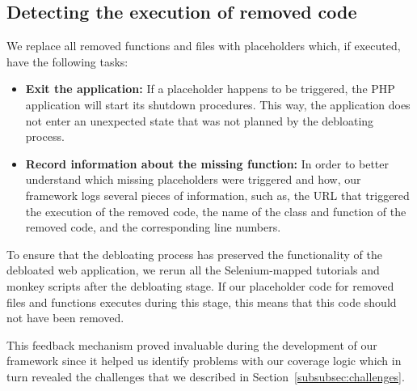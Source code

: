 \subsection{Detecting the execution of removed code}
We replace all removed functions and files with placeholders which, if executed,
have the following tasks:
\begin{itemize}
    \item \textbf{Exit the application:} If a placeholder happens to be triggered, the PHP application will start its shutdown procedures. This way, the application does not enter an unexpected state that was not planned by the debloating process.
    \item \textbf{Record information about the missing function:} In order to better understand which missing placeholders were triggered and how, our framework logs several pieces of information, such as, the URL that triggered the execution of the removed code, the name of the class and function of the removed code, and the corresponding line numbers.
\end{itemize}

To ensure that the debloating process has preserved the functionality of
the debloated web application, we rerun all the Selenium-mapped tutorials and monkey scripts
after the debloating stage. If our placeholder code for removed files and
functions executes during this stage, this means that this code should not
have been removed.

This feedback mechanism proved invaluable during the development of
our framework since it helped us identify problems with our coverage
logic which in turn revealed the challenges that we described in
Section~\ref{subsubsec:challenges}.